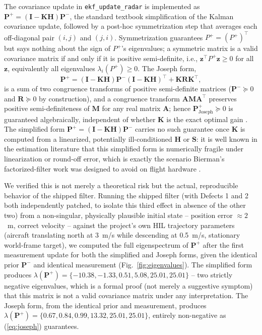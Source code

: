 \documentclass[conference]{IEEEtran}
\begin{document}
The covariance update in \texttt{ekf\_update\_radar} is implemented as $\mathbf{P}^+ = (\mathbf{I}-\mathbf{K}\mathbf{H})\mathbf{P}^-$, the standard textbook simplification of the Kalman covariance update, followed by a post-hoc symmetrization step that averages each off-diagonal pair $(i,j)$ and $(j,i)$. Symmetrization guarantees $P^+ = (P^+)^\top$ but says nothing about the sign of $P^+$'s eigenvalues; a symmetric matrix is a valid covariance matrix if and only if it is positive semi-definite, i.e., $\mathbf{z}^\top P^+ \mathbf{z} \geq 0$ for all $\mathbf{z}$, equivalently all eigenvalues $\lambda_i(P^+) \geq 0$. The Joseph form,
\begin{equation}
\mathbf{P}^+ = (\mathbf{I}-\mathbf{K}\mathbf{H})\mathbf{P}^-(\mathbf{I}-\mathbf{K}\mathbf{H})^\top + \mathbf{K}\mathbf{R}\mathbf{K}^\top,
\label{eq:joseph}
\end{equation}
is a sum of two congruence transforms of positive semi-definite matrices ($\mathbf{P}^-\succeq 0$ and $\mathbf{R}\succeq 0$ by construction), and a congruence transform $\mathbf{A} \mathbf{M} \mathbf{A}^\top$ preserves positive semi-definiteness of $\mathbf{M}$ for any real matrix $\mathbf{A}$; hence $\mathbf{P}^+_{\text{Joseph}} \succeq 0$ is guaranteed algebraically, independent of whether $\mathbf{K}$ is the exact optimal gain \cite{r3,r4}. The simplified form $\mathbf{P}^+ = (\mathbf{I}-\mathbf{K}\mathbf{H})\mathbf{P}^-$ carries no such guarantee once $\mathbf{K}$ is computed from a linearized, potentially ill-conditioned $\mathbf{H}$ or $\mathbf{S}$: it is well known in the estimation literature \cite{r3,r4} that this simplified form is numerically fragile under linearization or round-off error, which is exactly the scenario Bierman's factorized-filter work was designed to avoid on flight hardware \cite{r3,r15}.

We verified this is not merely a theoretical risk but the actual, reproducible behavior of the shipped filter. Running the shipped filter (with Defects 1 and 2 both independently patched, to isolate this third effect in absence of the other two) from a non-singular, physically plausible initial state -- position error $\approx 2$~m, correct velocity -- against the project's own HIL trajectory parameters (aircraft translating north at 3~m/s while descending at 0.5~m/s, stationary world-frame target), we computed the full eigenspectrum of $\mathbf{P}^+$ after the first measurement update for both the simplified and Joseph forms, given the identical prior $\mathbf{P}^-$ and identical measurement (Fig.~\ref{fig:eigenvalues}). The simplified form produces $\lambda(\mathbf{P}^+) = \{-10.38, -1.33, 0.51, 5.08, 25.01, 25.01\}$ -- two strictly negative eigenvalues, which is a formal proof (not merely a suggestive symptom) that this matrix is not a valid covariance matrix under any interpretation. The Joseph form, from the identical prior and measurement, produces $\lambda(\mathbf{P}^+) = \{0.67, 0.84, 0.99, 13.32, 25.01, 25.01\}$, entirely non-negative as (\ref{eq:joseph}) guarantees.
\end{document}
